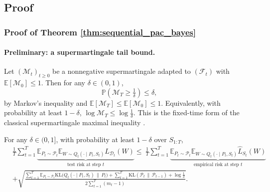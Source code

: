 \documentclass{article}
\begin{document}
\subsection{Proof}

\subsubsection{Proof of Theorem \ref{thm:sequential_pac_bayes}}
\label{proof:theorem all}

\paragraph{Preliminary: a supermartingale tail bound.}
Let $(\mathcal M_t)_{t\ge0}$ be a nonnegative supermartingale adapted to $(\mathcal F_t)$ with $\mathbb E[\mathcal M_0]\le 1$.
Then for any $\delta\in(0,1)$,
\[
\mathbb P\!\left(\mathcal M_T \ge \tfrac{1}{\delta}\right)
\le \delta,
\]
by Markov's inequality and $\mathbb E[\mathcal M_T]\le \mathbb E[\mathcal M_0]\le 1$.
Equivalently, with probability at least $1-\delta$, $\log \mathcal M_T \le \log \tfrac{1}{\delta}$.
This is the fixed-time form of the classical supermartingale maximal inequality  \citet{yangshuxue}.


\begin{theorem}
\label{the: full}
For any $\delta\in(0,1]$, with probability at least $1-\delta$ over $S_{1:T}$,
\begin{equation}
\begin{aligned} 
& \frac{1}{T} \sum_{t=1}^T \underbrace{\mathbb{E}_{P_t \sim \mathcal{P}_t} \mathbb{E}_{W \sim Q_t(\cdot \mid P_t, S_t)} L_{\mathcal{D}_t}(W)}_{\text{test risk at step } t} 
\le \ \frac{1}{T} \sum_{t=1}^T \underbrace{\mathbb{E}_{P_t \sim \mathcal{P}_t} \mathbb{E}_{W \sim Q_t(\cdot \mid P_t, S_t)} \hat{L}_{S_t}(W)}_{\text{empirical risk at step } t} \\ 
& + \sqrt{\frac{ \sum_{t=1}^T \mathbb{E}_{P_t \sim \mathcal{P}_t} \mathrm{KL}\big(Q_t(\cdot \mid P_t, S_t) \,\|\, P_t\big) + \sum_{t=1}^T \mathrm{KL}(\mathcal{P}_t \,\|\, \mathcal{P}_{t-1}) + \log\frac{1}{\delta} }{2 \sum_{t=1}^T (m_t - 1)}}. 
\end{aligned} 
\end{equation}
\end{theorem}
\end{document}
